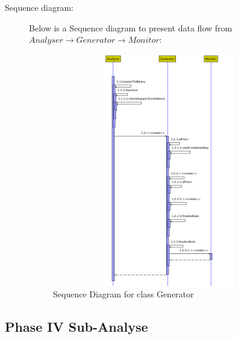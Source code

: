 \begin{description}
\item[Sequence diagram: ] 

Below is a Sequence diagram to present data flow from $Analyser \rightarrow Generator \rightarrow Monitor$:

\begin{figure}[h]
    \centering
    \includegraphics[width=4.5in, height=4in]{figures/sequence_generator}
    \caption[Sequence Diagram for class Generator]{Sequence Diagram for class Generator}
    \label{fig:figure4_42}
\end{figure}

\end{description}

\subsection{Phase IV Sub-Analyse}

